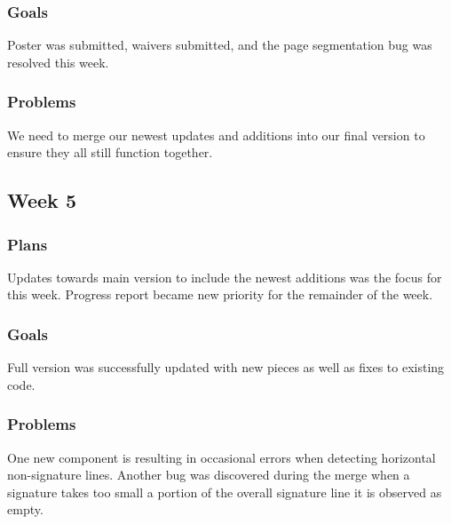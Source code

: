 \documentclass[onecolumn, draftclsnofoot,10pt, compsoc]{IEEEtran}
\begin{document}
\subsubsection{Goals}
Poster was submitted, waivers submitted, and the page segmentation bug was resolved this week.  

\subsubsection{Problems}
We need to merge our newest updates and additions into our final version to ensure they all still function together.

\subsection{Week 5}
\subsubsection{Plans}
Updates towards main version to include the newest additions was the focus for this week. Progress report became new priority for the remainder of the week.

\subsubsection{Goals}
Full version was successfully updated with new pieces as well as fixes to existing code. 

\subsubsection{Problems}
One new component is resulting in occasional errors when detecting horizontal non-signature lines. Another bug was discovered during the merge when a signature takes too small a portion of the overall signature line it is observed as empty.
\end{document}
